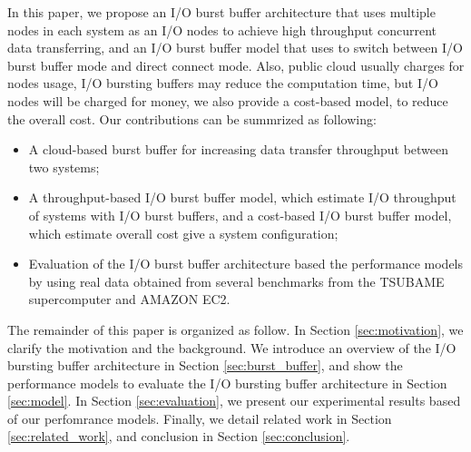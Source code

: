 In this paper, we propose an I/O burst buffer architecture that uses multiple nodes in each system as an I/O nodes 
to achieve high throughput concurrent data transferring, and an I/O burst buffer model 
that uses to switch between I/O burst buffer mode and direct connect mode.
Also, public cloud usually charges for nodes usage, I/O bursting buffers may reduce the computation time, 
but I/O nodes will be charged for money, we also provide a cost-based model, to reduce the overall cost.
Our contributions can be summrized as following:
\begin{itemize}
	\item A cloud-based burst buffer for increasing data transfer throughput between two systems;
	\item A throughput-based I/O burst buffer model, which estimate I/O throughput of systems with I/O burst buffers, and a cost-based I/O burst buffer model, which estimate overall cost give a system configuration;
        \item Evaluation of the I/O burst buffer architecture based the performance models by using real data obtained from several benchmarks from the TSUBAME supercomputer and AMAZON EC2.
\end{itemize}
The remainder of this paper is organized as follow. 
In Section \ref{sec:motivation}, we clarify the motivation and the background.
We introduce an overview of the I/O bursting buffer architecture in Section \ref{sec:burst_buffer}, 
and show the performance models to evaluate the I/O bursting buffer architecture in Section \ref{sec:model}. 
In Section \ref{sec:evaluation}, we present our experimental results based of our perfomrance models. %
Finally, we detail related work in Section \ref{sec:related_work}, and conclusion in Section \ref{sec:conclusion}.
